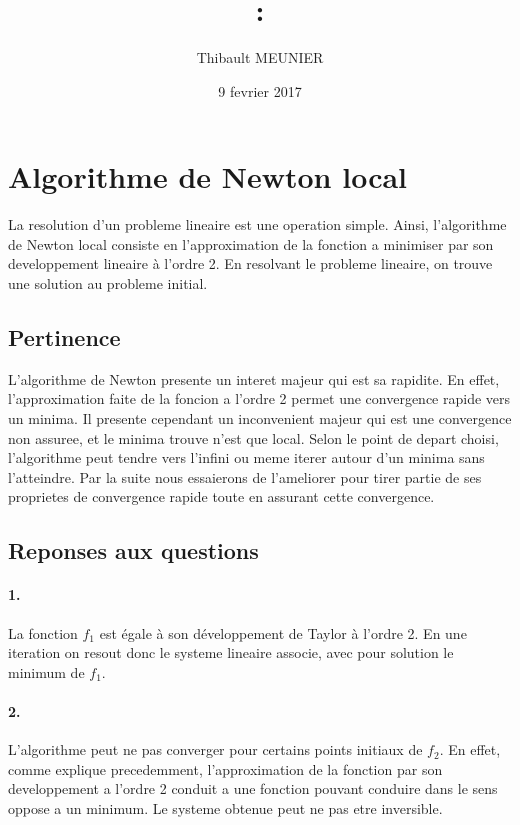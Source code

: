 \documentclass[12pt]{article}
\title{\Matiere:\\ \titre}
\author{Thibault MEUNIER}
\date{9 fevrier 2017}
\begin{document}
\maketitle

\setcounter{page}{0}
\thispagestyle{empty} %

\newpage

\renewcommand{\contentsname}{Sommaire}
\tableofcontents
\newpage

\section{Algorithme de Newton local}
La resolution d'un probleme lineaire est une operation simple. Ainsi, l'algorithme de Newton local consiste en l'approximation de la fonction a minimiser par son developpement lineaire à l'ordre 2. En resolvant le probleme lineaire, on trouve une solution au probleme initial.

\subsection{Pertinence}
L'algorithme de Newton presente un interet majeur qui est sa rapidite. En effet, l'approximation faite de la foncion a l'ordre 2 permet une convergence rapide vers un minima.\newline
Il presente cependant un inconvenient majeur qui est une convergence non assuree, et le minima trouve n'est que local. Selon le point de depart choisi, l'algorithme peut tendre vers l'infini ou meme iterer autour d'un minima sans l'atteindre.\newline
Par la suite nous essaierons de l'ameliorer pour tirer partie de ses proprietes de convergence rapide toute en assurant cette convergence.

\subsection{Reponses aux questions}
\paragraph{1.}
La fonction $f_1$ est égale à son développement de Taylor à l'ordre 2. En une iteration on resout donc le systeme lineaire associe, avec pour solution le minimum de $f_1$.

\paragraph{2.}
L'algorithme peut ne pas converger pour certains points initiaux de $f_2$. En effet, comme explique precedemment, l'approximation de la fonction par son developpement a l'ordre 2 conduit a une fonction pouvant conduire dans le sens oppose a un minimum. Le systeme obtenue peut ne pas etre inversible.
\end{document}
